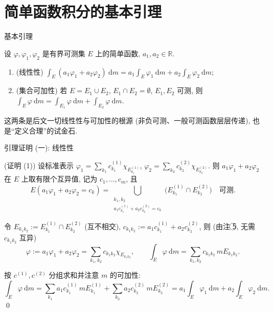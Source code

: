 
\section[基本引理]{简单函数积分的基本引理}


\begin{frame}{基本引理}

\begin{lem}[线性性与集合可加性]
设 $\varphi, \varphi_1, \varphi_2$ 是有界可测集 $E$ 上的简单函数, $a_1, a_2 \in \mathbb{R}$.
\begin{enumerate}
\item (线性性)
$\displaystyle \int_E (a_1 \varphi_1 + a_2 \varphi_2) ~ \mathrm{d} m
= a_1 \int_E \varphi_1 ~ \mathrm{d} m + a_2 \int_E \varphi_2 ~ \mathrm{d} m$;
\item (集合可加性) 若 $E = E_1 \cup E_2$, $E_1 \cap E_2 = \emptyset$, $E_1, E_2$ 可测, 则
$\displaystyle \int_E \varphi ~ \mathrm{d} m
= \int_{E_1} \varphi ~ \mathrm{d} m + \int_{E_2} \varphi ~ \mathrm{d} m$.
\end{enumerate}
\end{lem}

\pause

\begin{attnblock}
这两条是后文\alert{一切}线性性与可加性的根源 (非负可测、一般可测函数层层传递),
也是``定义合理''的试金石.
\end{attnblock}

\end{frame}


\begin{frame}{引理证明 (一): 线性性}

\startproof[bg=yellow, fg=red](证明 (1))
设标准表示
$\varphi_1 = \sum_{k_1} c^{(1)}_{k_1} \chi_{E^{(1)}_{k_1}}$,
$\varphi_2 = \sum_{k_2} c^{(2)}_{k_2} \chi_{E^{(2)}_{k_2}}$.
则 $a_1 \varphi_1 + a_2 \varphi_2$ 在 $E$ 上取有限个互异值, 记为 $c_1, \dots, c_m$, 且
\[
E(a_1 \varphi_1 + a_2 \varphi_2 = c_k)
= \bigcup_{\substack{k_1, k_2 \\ a_1 c^{(1)}_{k_1} + a_2 c^{(2)}_{k_2} = c_k}}
\big( E^{(1)}_{k_1} \cap E^{(2)}_{k_2} \big)
\quad \text{可测}.
\]

\pause

令 $E_{k_1 k_2} := E^{(1)}_{k_1} \cap E^{(2)}_{k_2}$ (互不相交),
$c_{k_1 k_2} := a_1 c^{(1)}_{k_1} + a_2 c^{(2)}_{k_2}$, 则 (由注 \textcircled{5}, 无需 $c_{k_1 k_2}$ 互异)
\[
\varphi := a_1 \varphi_1 + a_2 \varphi_2 = \sum_{k_1, k_2} c_{k_1 k_2} \chi_{E_{k_1 k_2}},
\qquad
\int_E \varphi ~ \mathrm{d} m = \sum_{k_1, k_2} c_{k_1 k_2}\, m E_{k_1 k_2} .
\]

\pause

按 $c^{(1)}, c^{(2)}$ 分组求和并注意 $m$ 的可加性:
\[
\int_E \varphi ~ \mathrm{d} m
= \sum_{k_1} a_1 c^{(1)}_{k_1}\, m E^{(1)}_{k_1}
+ \sum_{k_2} a_2 c^{(2)}_{k_2}\, m E^{(2)}_{k_2}
= a_1 \int_E \varphi_1 ~ \mathrm{d} m + a_2 \int_E \varphi_2 ~ \mathrm{d} m .
\]
\qed

\end{frame}

